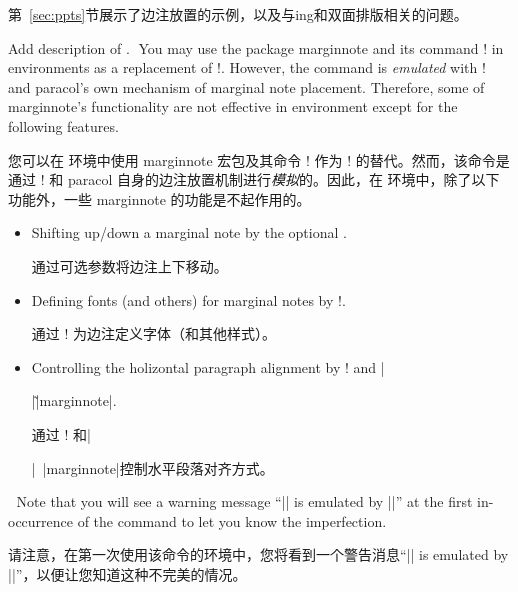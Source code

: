 \begin{description}
\begin{itemize}
第~\ref{sec:ppts}节展示了边注放置的示例，以及与\parapag{}ing和双面排版相关的问题。
\end{itemize}



\item[\Midx{\!\marginnote!}\oarg{left}\marg{right}\oarg{voffset}]\mbox{}\par
{}
{Add description of .}
You may use the package \textsf{marginnote} and its command \!\marginnote!
in  environments as a replacement of \!\marginpar!.  However,
the command is \emph{emulated} with \!\marginpar! and \textsf{paracol}'s
own mechanism of marginal note placement.  Therefore, some of
\textsf{marginnote}'s functionality are not effective in 
environment except for the following features.

您可以在  环境中使用 \textsf{marginnote} 宏包及其命令 \!\marginnote! 作为 \!\marginpar! 的替代。然而，该命令是通过 \!\marginpar! 和 \textsf{paracol} 自身的边注放置机制进行\emph{模拟}的。因此，在  环境中，除了以下功能外，一些 \textsf{marginnote} 的功能是不起作用的。
\begin{itemize}
\item
Shifting up/down a marginal note by the optional .

通过可选参数将边注上下移动。
\item
Defining fonts (and others) for marginal notes by \!\marginfont!.

通过 \!\marginfont! 为边注定义字体（和其他样式）。
\item
Controlling the holizontal paragraph alignment by \!\raggedleftmarginnote!
and |\raggedright|\~|marginnote|\SpecialIndex{\raggedrightmarginnote}.

通过 \!\raggedleftmarginnote! 和|\raggedright|~|marginnote|控制水平段落对齐方式。
\end{itemize}

Note that you will see a warning message ``|\margninnote| is emulated by
|\marginpar|'' at the first in- occurrence of the command to
let you know the imperfection.

请注意，在第一次使用该命令的环境中，您将看到一个警告消息“|\margninnote| is emulated by |\marginpar|”，以便让您知道这种不完美的情况。
\end{description}

